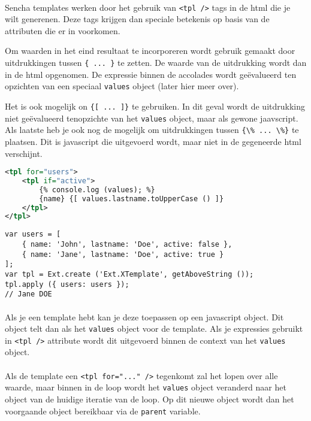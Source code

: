 \paragraph {} Sencha templates werken door het gebruik van \lstinline{<tpl />} tags in de
html die je wilt generenen. Deze tags krijgen dan speciale betekenis op basis van de
attributen die er in voorkomen.

Om waarden in het eind resultaat te incorporeren wordt
gebruik gemaakt door uitdrukkingen tussen \lstinline|{ ... }| te zetten. De waarde van de
uitdrukking wordt dan in de html opgenomen. De expressie binnen de accolades wordt
ge\"evalueerd ten opzichten van een speciaal \lstinline{values} object (later hier meer
over).

Het is ook mogelijk on \lstinline|{[ ... ]}|
te gebruiken. In dit geval wordt de uitdrukking niet ge\"evalueerd tenopzichte van het
\lstinline{values} object, maar als gewone jaavscript. Als laatste heb je ook nog de
mogelijk om uitdrukkingen tussen \lstinline|{\% ... \%}| te plaatsen. Dit is javascript
die uitgevoerd wordt, maar niet in de gegeneerde html verschijnt.

\begin{lstlisting}[language=xml]
<tpl for="users">
	<tpl if="active">
		{% console.log (values); %}
		{name} {[ values.lastname.toUpperCase () ]}
	</tpl>
</tpl>
\end{lstlisting}

\begin{lstlisting}[language=ownjavascript]
var users = [
	{ name: 'John', lastname: 'Doe', active: false },
	{ name: 'Jane', lastname: 'Doe', active: true }
];
var tpl = Ext.create ('Ext.XTemplate', getAboveString ());
tpl.apply ({ users: users });
// Jane DOE
\end{lstlisting}

\paragraph {} Als je een template hebt kan je deze toepassen op een javascript object. Dit
object telt dan als het \lstinline{values} object voor de template. Als je expressies
gebruikt in \lstinline{<tpl />} attribute wordt dit uitgevoerd binnen de context van het
\lstinline{values} object.

\paragraph {} Als de template een \lstinline{<tpl for="..." />} tegenkomt zal het lopen
over alle waarde, maar binnen in de loop wordt het \lstinline{values} object veranderd
naar het object van de huidige iteratie van de loop. Op dit nieuwe object wordt dan het
voorgaande object bereikbaar via de \lstinline {parent} variable.

